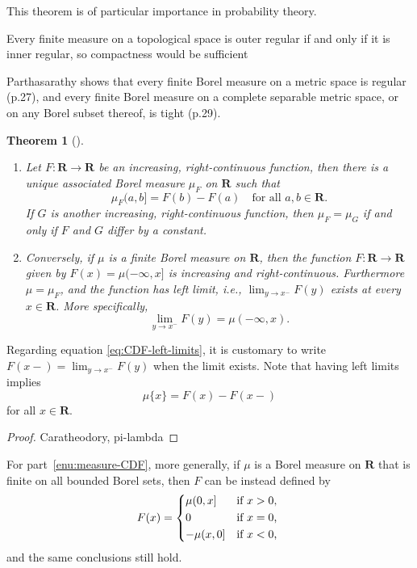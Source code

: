 \documentclass[10pt]{book}
\numberwithin{equation}{chapter}
\theoremstyle{plain-star}
\newtheorem{thm}[equation]{Theorem}
\theoremstyle{definition-star}
\theoremstyle{remark-star}
\theoremstyle{plain-star}
\newcommand{\R}{\mathbf{R}}
\begin{document}
This theorem is of particular importance in probability theory.

Every finite measure on a topological space is outer regular if and only if it is inner regular, so compactness would be sufficient

Parthasarathy shows that every finite Borel measure on a metric space is regular (p.27), and every finite Borel measure on a complete separable metric space, or on any Borel subset thereof, is tight (p.29).

\begin{thm}[{\cite[Theorem~1.16]{folland1999}}] \label{thm:increasing-rcont-Borel-measure-connection} \leavevmode
    \begin{enumerate}
        \item \label{enu:CDF-measure} Let $F\colon \R \to \R$ be an increasing, right-continuous function, then there is a unique associated Borel measure $\mu_F$ on $\R$ such that \[
        \mu_F(a,b] = F(b) - F(a)\quad \text{for all }a,b\in \R.
    \] If $G$ is another increasing, right-continuous function, then $\mu_F = \mu_G$ if and only if $F$ and $G$ differ by a constant.
        \item \label{enu:measure-CDF} Conversely, if $\mu$ is a finite Borel measure on $\R$, then the function $F\colon \R \to \R$ given by $F(x) = \mu(-\infty,x]$ is increasing and right-continuous. Furthermore $\mu = \mu_F$, and the function has left limit, i.e., $\lim_{y \to x^-} F(y)$ exists at every $x \in \R$. More specifically, \begin{equation} \label{eq:CDF-left-limits}
             \lim_{y \to x^-} F(y) = \mu(-\infty,x).
        \end{equation}
    \end{enumerate}
\end{thm}

Regarding equation \eqref{eq:CDF-left-limits}, it is customary to write $F(x-) = \lim_{y \to x^-} F(y)$ when the limit exists. Note that having left limits implies \[\mu\{x\} = F(x) - F(x-)\] for all $x \in \R$.

\begin{proof}
    Caratheodory, pi-lambda
\end{proof}

    For part~\ref{enu:measure-CDF}, more generally, if $\mu$ is a Borel measure on $\R$ that is finite on all bounded Borel sets, then $F$ can be instead defined by \[
        F(x) = \begin{cases*}
            \mu (0,x] & if $x > 0$, \\
            0 & if $x = 0$, \\
            -\mu(x,0] & if $x < 0$,
        \end{cases*}
    \] and the same conclusions still hold.
\end{document}

